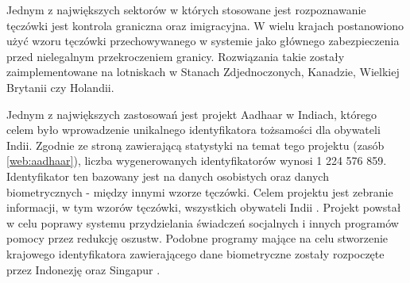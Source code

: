 Jednym z największych sektorów w których stosowane jest rozpoznawanie tęczówki jest kontrola graniczna
oraz imigracyjna. W wielu krajach postanowiono uży\'c wzoru tęczówki przechowywanego w systemie jako głównego
zabezpieczenia przed nielegalnym przekroczeniem granicy. Rozwiązania takie zostały zaimplementowane na lotniskach
w Stanach Zdjednoczonych, Kanadzie, Wielkiej Brytanii czy Holandii.

Jednym z największych zastosowań jest projekt Aadhaar w Indiach, którego celem było wprowadzenie
unikalnego identyfikatora tożsamości dla obywateli Indii. Zgodnie ze stroną zawierającą statystyki na
temat tego projektu (zasób \ref{web:aadhaar}), liczba wygenerowanych identyfikatorów wynosi 1 224 576 859.
Identyfikator ten bazowany jest na danych
osobistych oraz danych biometrycznych - między innymi wzorze tęczówki. Celem projektu jest zebranie
informacji, w tym wzorów tęczówki, wszystkich obywateli Indii \cite{DaugmanIndia}. Projekt powstał w
celu poprawy systemu przydzielania świadczeń socjalnych i innych programów pomocy przez redukcję oszustw.
Podobne programy mające na celu stworzenie krajowego identyfikatora zawierającego dane biometryczne
zostały rozpoczęte przez Indonezję oraz Singapur \cite{DaugmanApplications}.

